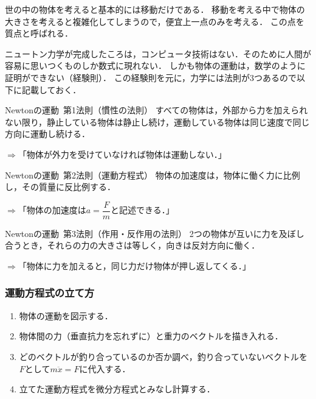 \documentclass[a4paper,11pt]{ltjsarticle}
\begin{document}
世の中の物体を考えると基本的には移動だけである．
移動を考える中で物体の大きさを考えると複雑化してしまうので，便宜上一点のみを考える．
この点を質点と呼ばれる．

ニュートン力学が完成したころは，コンピュータ技術はない．そのために人間が容易に思いつくものしか数式に現れない．
しかも物体の運動は，数学のように証明ができない（経験則）．
この経験則を元に，力学には法則が3つあるので以下に記載しておく．


\begin{itembox}[l]{Newtonの運動\ 第1法則（慣性の法則）}
  すべての物体は，外部から力を加えられない限り，静止している物体は静止し続け，運動している物体は同じ速度で同じ方向に運動し続ける．
\end{itembox}

$\Longrightarrow$「物体が外力を受けていなければ物体は運動しない．」


\begin{itembox}[l]{Newtonの運動\ 第2法則（運動方程式）}
  物体の加速度は，物体に働く力に比例し，その質量に反比例する．
\end{itembox}

$\Longrightarrow$「物体の加速度は$a=\dfrac{F}{m}$と記述できる．」


\begin{itembox}[l]{Newtonの運動\ 第3法則（作用・反作用の法則）}
  2つの物体が互いに力を及ぼし合うとき，それらの力の大きさは等しく，向きは反対方向に働く．
\end{itembox}

$\Longrightarrow$「物体に力を加えると，同じ力だけ物体が押し返してくる．」

\subsubsection{運動方程式の立て方}


\begin{enumerate}
  \item 物体の運動を図示する．
  \item 物体間の力（垂直抗力を忘れずに）と重力のベクトルを描き入れる．
  \item どのベクトルが釣り合っているのか否か調べ，釣り合っていないベクトルを$F$として$m\ddot{x}=F$に代入する．
  \item 立てた運動方程式を微分方程式とみなし計算する．
\end{enumerate}
\end{document}
